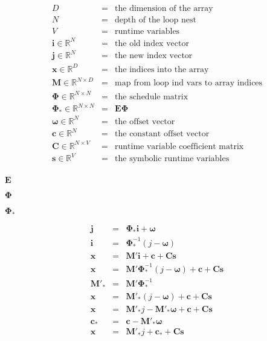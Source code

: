 \documentclass{article}
\begin{document}
\begin{eqnarray*} D &=& \text{the dimension of the array}\\ N &=& \text{depth of the loop nest}\\ V &=& \text{runtime variables}\\ \textbf{i}\in\mathbb{R}^N &=& \text{the old index vector}\\ \textbf{j}\in\mathbb{R}^N &=& \text{the new index vector}\\ \textbf{x}\in\mathbb{R}^D &=& \text{the indices into the array}\\ \textbf{M}\in\mathbb{R}^{N \times D} &=& \text{map from loop ind vars to array indices}\\ \boldsymbol{\Phi}\in\mathbb{R}^{N \times N} &=& \text{the schedule matrix}\\ \boldsymbol{\Phi}_*\in\mathbb{R}^{N \times N} &=& \textbf{E}\boldsymbol{\Phi}\\ \boldsymbol{\omega}\in\mathbb{R}^N &=& \text{the offset vector}\\ \textbf{c}\in\mathbb{R}^{N} &=& \text{the constant offset vector}\\ \textbf{C}\in\mathbb{R}^{N \times V} &=& \text{runtime variable coefficient matrix}\\ \textbf{s}\in\mathbb{R}^V &=& \text{the symbolic runtime variables}\\ \end{eqnarray*}
\pagebreak

$\textbf{E}$
\pagebreak

$\boldsymbol{\Phi}$
\pagebreak

$\boldsymbol{\Phi}_*$
\pagebreak

\begin{eqnarray*} \textbf{j} &=& \boldsymbol{\Phi}_*\textbf{i} + \boldsymbol{\omega}\\ \textbf{i} &=& \boldsymbol{\Phi}_*^{-1}\left(j - \boldsymbol{\omega}\right)\\ \textbf{x} &=& \textbf{M}'\textbf{i} + \textbf{c} + \textbf{Cs} \\ \textbf{x} &=& \textbf{M}'\boldsymbol{\Phi}_*^{-1}\left(j - \boldsymbol{\omega}\right) + \textbf{c} + \textbf{Cs} \\ \textbf{M}'_* &=& \textbf{M}'\boldsymbol{\Phi}_*^{-1}\\ \textbf{x} &=& \textbf{M}'_*\left(j - \boldsymbol{\omega}\right) + \textbf{c} + \textbf{Cs} \\ \textbf{x} &=& \textbf{M}'_*j - \textbf{M}'_*\boldsymbol{\omega} + \textbf{c} + \textbf{Cs} \\ \textbf{c}_* &=& \textbf{c} - \textbf{M}'_*\boldsymbol{\omega} \\ \textbf{x} &=& \textbf{M}'_*j + \textbf{c}_* + \textbf{Cs} \\ \end{eqnarray*}
\pagebreak
\end{document}

